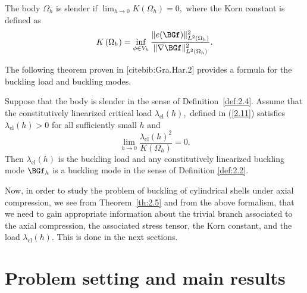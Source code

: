\begin{definition}
\label{def:2.4}
The body $\Omega_{h}$ is slender if $\lim _{h \rightarrow 0} K\left(\Omega_{h}\right)=0,$ where the Korn constant is defined as
$$
K\left(\Omega_h \right)=\inf _{\phi \in V_h} \frac{\|e(\BGf)\|_{L^{2}\left(\Omega_{h}\right)}^{2}}{\|\nabla \BGf\|_{L^{2}\left(\Omega_{h}\right)}^{2}}.
$$
\end{definition}

The following theorem proven in [cite{bib:Gra.Har.2}] provides a formula for the buckling load and buckling modes. 

\begin{theorem}
\label{th:2.5}
Suppose that the body is slender in the sense of Definition~\ref{def:2.4}. Assume that the constitutively linearized critical load $\lambda_{\mathrm{cl}}(h),$ defined in (\ref{2.11}) satisfies $\lambda_{\mathrm{cl}}(h)>0$ for all sufficiently small $h$ and
$$
\lim _{h \rightarrow 0} \frac{\lambda_{\mathrm{cl}}(h)^{2}}{K\left(\Omega_{h}\right)}=0.
$$
Then $\lambda_{\mathrm{cl}}(h)$ is the buckling load and any constitutively linearized buckling mode $\BGf_{h}$ is a buckling mode in the sense of Definition \ref{def:2.2}.
\end{theorem}

Now, in order to study the problem of buckling of cylindrical shells under axial compression, we see from Theorem~\ref{th:2.5} and from the above formalism, that we need to gain appropriate information about the trivial branch associated to the axial compression, the associated stress tensor, the Korn constant, and the load 
$\lambda_{\mathrm{cl}}(h).$ This is done in the next sections. 



\section{Problem setting and main results}
\setcounter{equation}{0}
\label{sec:3}







